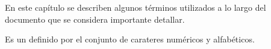 \label{sec:glosario}
    En este capítulo se describen algunos términos utilizados a lo largo del documento que se considera importante detallar. 
  
\begin{description}
	 Es un  definido por el conjunto de carateres numéricos y alfabéticos.
\end{description}
